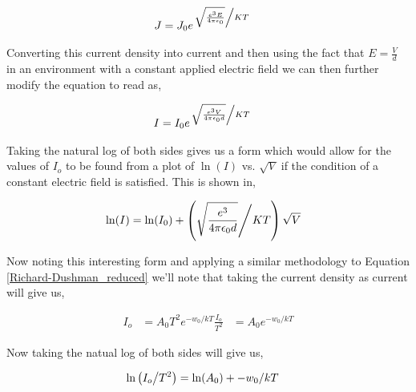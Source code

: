 \begin{align}
   & J = J_0 e^{\left. \sqrt{\frac{e^3 E}{4 \pi \epsilon_0}} \middle/ KT \right.}
\end{align}

Converting this current density into current and then using the fact that $ E = \frac{V}{d}$ in an environment with a constant applied electric field we can then further modify the equation to read as,

\begin{align}
   & I = I_0 e^{\left. \sqrt{\frac{e^3 V}{4 \pi \epsilon_0 d}} \middle/ KT \right.}
\end{align}

Taking the natural log of both sides gives us a form which would allow for the values of $I_o$ to be found from a plot of $\ln(I)$ vs. $\sqrt{V}$ if the condition of a constant electric field is satisfied. This is shown in,

\begin{align}
   & \ln(I) = \ln(I_0) + \left( \sqrt{\frac{e^3}{4 \pi \epsilon_0 d}} \middle/ KT \right) \sqrt{V} \label{plot_1eqn}
\end{align}

Now noting this interesting form and applying a similar methodology to Equation \ref{Richard-Dushman_reduced} we'll note that taking the current density as current will give us,

\begin{align}
   I_o & = A_0 T^2e^{-w_0/kT}
   \frac{I_o}{T^2} & = A_0 e^{-w_0/kT}
\end{align}

Now taking the natual log of both sides will give us,

\begin{align}
    \ln\left(I_o \middle/ T^2\right) & = \ln(A_0) + -w_0/kT \label{plot_2eqn}
\end{align}





